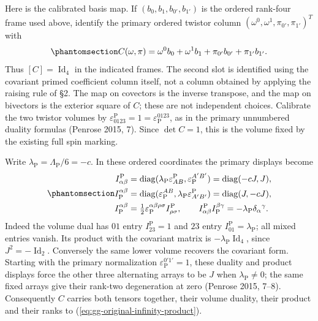 \documentclass[
  english,
  11pt,
  reqno]{amsart}
\begin{document}
Here is the calibrated basis map. If \((b_0,b_1,b_{0'},b_{1'})\) is the
ordered rank-four frame used above, identify the primary ordered twistor
column \((\omega^0,\omega^1,\pi_{0'},\pi_{1'})^T\) with
\begin{equation}\protect\phantomsection\label{eq:gg-original-infinity-external-basis}{
 C(\omega,\pi)
   =\omega^0b_0+\omega^1b_1
                         +\pi_{0'}b_{0'}+\pi_{1'}b_{1'} .
}\end{equation} Thus \([C]=\operatorname{Id}_4\) in the indicated
frames. The second slot is identified using the covariant primed
coefficient column itself, not a column obtained by applying the raising
rule of §2. The map on covectors is the inverse transpose, and the map
on bivectors is the exterior square of \(C\); these are not independent
choices. Calibrate the two twistor volumes by
\(\varepsilon^{\mathrm P}_{0123}=1=\varepsilon_{\mathrm P}^{0123}\), as
in the primary unnumbered duality formulas (Penrose 2015, 7). Since
\(\det C=1\), this is the volume fixed by the existing full spin
marking.

Write \(\lambda_{\mathrm P}=\Lambda_{\mathrm P}/6=-c\). In these ordered
coordinates the primary displays become
\begin{equation}\protect\phantomsection\label{eq:gg-original-infinity-external-volume-forms}{
 \begin{aligned}
 I^{\mathrm P}_{\alpha\beta}
   &=\operatorname{diag}
          (\lambda_{\mathrm P}\varepsilon^{\mathrm P}_{AB},
                                  \varepsilon_{\mathrm P}^{A'B'})
     =\operatorname{diag}(-cJ,J),\\
 I_{\mathrm P}^{\alpha\beta}
   &=\operatorname{diag}
          (\varepsilon_{\mathrm P}^{AB},
                        \lambda_{\mathrm P}\varepsilon^{\mathrm P}_{A'B'})
     =\operatorname{diag}(J,-cJ),\\
 I_{\mathrm P}^{\alpha\beta}
   &=\tfrac12\varepsilon_{\mathrm P}^{\alpha\beta\rho\sigma}
                                    I^{\mathrm P}_{\rho\sigma},
 \qquad
 I^{\mathrm P}_{\alpha\beta}I_{\mathrm P}^{\beta\gamma}
      =-\lambda_{\mathrm P}\delta_\alpha{}^\gamma .
 \end{aligned}
}\end{equation} Indeed the volume dual has \(01\) entry
\(I^{\mathrm P}_{23}=1\) and \(23\) entry
\(I^{\mathrm P}_{01}=\lambda_{\mathrm P}\); all mixed entries vanish.
Its product with the covariant matrix is
\(-\lambda_{\mathrm P}\operatorname{Id}_4\), since
\(J^2=-\operatorname{Id}_2\). Conversely the same lower volume recovers
the covariant form. Starting with the primary normalization
\(\varepsilon_{\mathrm P}^{0'1'}=1\), these duality and product displays
force the other three alternating arrays to be \(J\) when
\(\lambda_{\mathrm P}\ne0\); the same fixed arrays give their rank-two
degeneration at zero (Penrose 2015, 7--8). Consequently \(C\) carries
both tensors together, their volume duality, their product and their
ranks to (\ref{eq:gg-original-infinity-product}).
\end{document}
